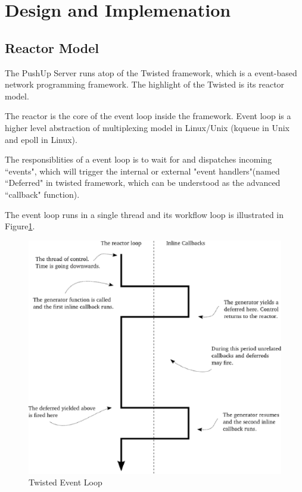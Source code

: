 \section {Design and Implemenation\\}

\subsection{Reactor Model\\}
The PushUp Server runs atop of the Twisted framework\cite{Twisted}, which is a event-based network programming framework. The highlight of the Twisted is its reactor model\cite{Reactor}.

The reactor is the core of the event loop inside the framework. Event loop is a higher level abstraction of multiplexing model in Linux/Unix (kqueue in Unix and epoll in Linux).

The responsiblities of a event loop is to wait for and dispatches incoming ``events", which will trigger the internal or external "event handlers"(named ``Deferred" in twisted framework, which can be understood as the advanced ``callback" function).

The event loop runs in a single thread and its workflow loop is illustrated in Figure\ref{fig:eventloop}.

\begin{figure}[htb!]
\centering%
    \includegraphics[scale=0.50]{figures/eventloop.eps}
    \caption{Twisted Event Loop}
    \label{fig:eventloop}
\end{figure}


